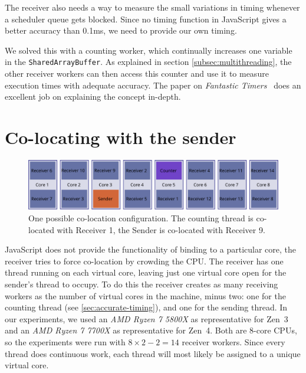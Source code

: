 \documentclass[11pt,
  titlepage=false,
]{scrreprt}
\begin{document}

The receiver also needs a way to measure the small variations in timing whenever a scheduler queue gets blocked.
Since no timing function in JavaScript gives a better accuracy than 0.1ms, we need to provide our own timing.

We solved this with a counting worker, which continually increases one variable in the \texttt{SharedArrayBuffer}.
As explained in section \ref{subsec:multithreading}, the other receiver workers can then access this counter and use it to measure execution times with adequate accuracy.
The paper on \textit{Fantastic Timers}~\cite{Schwarz2017Timers} does an excellent job on explaining the concept in-depth.

\section{Co-locating with the sender}
\label{sec:co-location}

\begin{figure}
\centering
\includegraphics[width=\textwidth]{figures/colocation}

\caption{One possible co-location configuration. The counting thread is co-located with Receiver 1, the Sender is co-located with Receiver 9.}
\label{fig:colocation}

\end{figure}

JavaScript does not provide the functionality of binding to a particular core,
the receiver tries to force co-location by crowding the CPU.
The receiver has one thread running on each virtual core,
leaving just one virtual core open for the sender's thread to occupy.
To do this the receiver creates as many receiving workers as the number of virtual cores in the machine, minus two:
one for the counting thread (see \ref{sec:accurate-timing}), and one for the sending thread.
In our experiments, we used an \textit{AMD Ryzen 7 5800X} as representative for Zen~3 and an \textit{AMD Ryzen 7 7700X} as representative for Zen~4.
Both are 8-core CPUs, so the experiments were run with $8 \times 2 - 2 = 14$ receiver workers.
Since every thread does continuous work, each thread will most likely be assigned to a unique virtual core.
\end{document}

